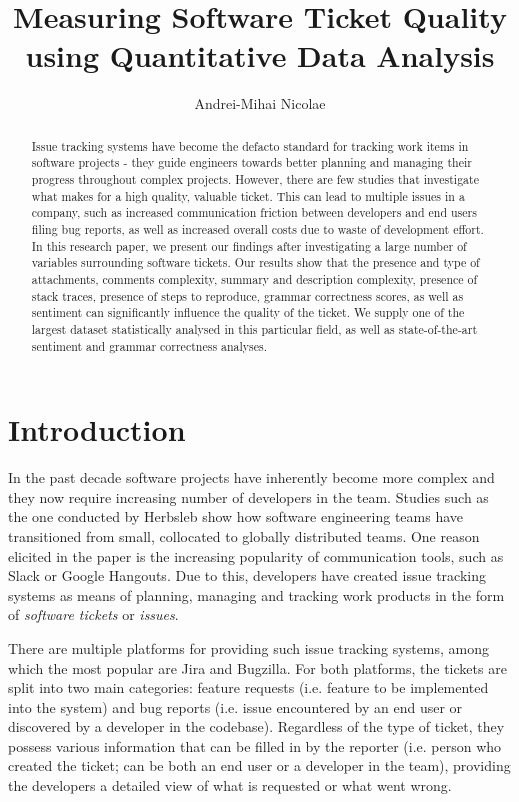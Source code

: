\documentclass{mpaper}
\begin{document}
\title{Measuring Software Ticket Quality using Quantitative Data Analysis}
\author{Andrei-Mihai Nicolae}

\maketitle

\begin{abstract}
Issue tracking systems have become the defacto standard for tracking work items in 
software projects - they guide engineers towards better planning and 
managing their progress throughout complex projects. However, there
are few studies that investigate what makes for a high quality,
valuable ticket. This can lead to multiple issues in a company, such as 
increased communication friction between developers and end users filing bug
reports, as well as increased overall costs due to waste of development effort. 
In this research paper, we present our findings after 
investigating a large number of variables surrounding software tickets.
Our results show that the presence and type of attachments,
comments complexity, summary and description complexity, presence of stack traces, presence
of steps to reproduce, grammar correctness scores, as well as sentiment can significantly influence 
the quality of the ticket. We supply one of the largest dataset statistically 
analysed in this particular field, as well as state-of-the-art sentiment and grammar correctness analyses.
\end{abstract}

\section{Introduction}\label{intro}

In the past decade software projects have inherently become more complex and they now require increasing number of developers in
the team. Studies such as the one conducted by Herbsleb \cite{herbsleb2007global} show how software engineering teams have 
transitioned from small, collocated to globally distributed teams. One reason elicited in the paper is the increasing 
popularity of communication tools, such as Slack or Google Hangouts. Due to this, developers have created issue tracking 
systems as means of planning, managing and tracking work products in the form of \emph{software tickets} or \emph{issues}.

There are multiple platforms for providing such issue tracking systems, among which
the most popular are Jira and Bugzilla. For both platforms,
the tickets are split into two main categories: feature requests (i.e. feature to be 
implemented into the system) and bug reports (i.e. issue encountered by an end user or
discovered by a developer in the codebase). Regardless of the type of ticket, they possess
various information that can be filled in by the reporter (i.e. person who created the ticket; 
can be both an end user or a developer in the team), providing the developers
a detailed view of what is requested or what went wrong.
\end{document}
